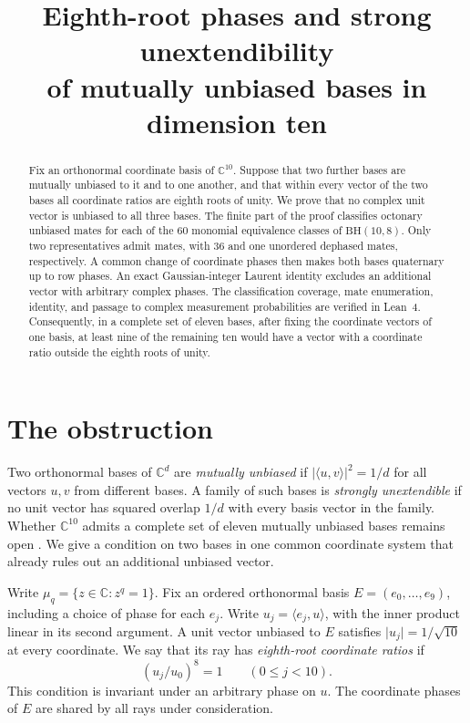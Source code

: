\documentclass[11pt]{article}
\title{Eighth-root phases and strong unextendibility\\of mutually unbiased bases in dimension ten}
\author{}
\date{}
\newcommand{\C}{\mathbb C}
\newcommand{\BH}{\mathrm{BH}}
\begin{document}
\maketitle
\vspace{-2.2em}
\begin{abstract}
Fix an orthonormal coordinate basis of \(\C^{10}\). Suppose that two further
bases are mutually unbiased to it and to one another, and that within every
vector of the two bases all coordinate ratios are eighth roots of unity.
We prove that no complex unit vector is unbiased to all three bases.
The finite part of the proof classifies octonary unbiased mates for each
of the 60 monomial equivalence classes of \(\BH(10,8)\). Only two
representatives admit mates, with 36 and one unordered dephased mates,
respectively. A common change of coordinate phases then makes both bases
quaternary up to row phases. An exact Gaussian-integer Laurent identity
excludes an additional vector with arbitrary complex phases. The
classification coverage, mate enumeration, identity, and passage to
complex measurement probabilities are verified in Lean~4. Consequently,
in a complete set of eleven bases, after fixing the coordinate vectors of
one basis, at least nine of the remaining ten would have a vector with a
coordinate ratio outside the eighth roots of unity.
\end{abstract}

\section{The obstruction}

Two orthonormal bases of \(\C^d\) are \emph{mutually unbiased} if
\(\lvert\langle u,v\rangle\rvert^2=1/d\) for all vectors \(u,v\) from
different bases. A family of such bases is \emph{strongly unextendible}
if no unit vector has squared overlap \(1/d\) with every basis vector in
the family. Whether \(\C^{10}\) admits a complete set of eleven mutually
unbiased bases remains open \cite{yang}. We give a condition on two bases
in one common coordinate system that already rules out an additional
unbiased vector.

Write \(\mu_q=\{z\in\C:z^q=1\}\). Fix an ordered orthonormal basis
\(E=(e_0,\ldots,e_9)\), including a choice of phase for each \(e_j\).
Write \(u_j=\langle e_j,u\rangle\), with the inner product linear in its
second argument. A unit vector unbiased to \(E\) satisfies
\(\lvert u_j\rvert=1/\sqrt{10}\) at every coordinate.
We say that its ray has \emph{eighth-root coordinate ratios} if
\[
                    (u_j/u_0)^8=1 \qquad(0\le j<10).
\]
This condition is invariant under an arbitrary phase on \(u\).
The coordinate phases of \(E\) are shared by all rays under consideration.
\end{document}
